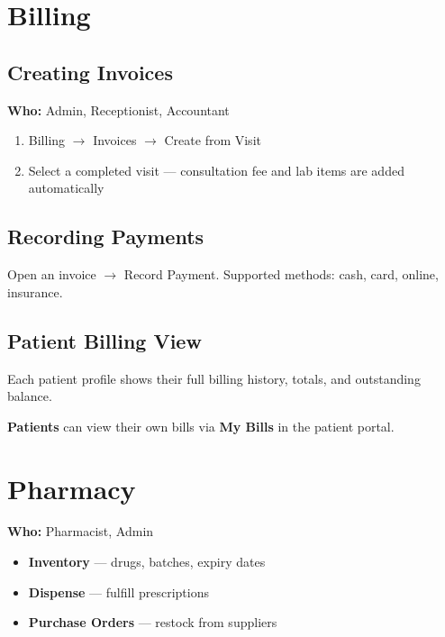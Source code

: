 \documentclass[11pt,a4paper]{report}
\begin{document}
\chapter{Billing}

\section{Creating Invoices}

\textbf{Who:} Admin, Receptionist, Accountant

\begin{enumerate}[noitemsep]
    \item Billing $\rightarrow$ Invoices $\rightarrow$ Create from Visit
    \item Select a completed visit --- consultation fee and lab items are added automatically
\end{enumerate}

\section{Recording Payments}

Open an invoice $\rightarrow$ Record Payment. Supported methods: cash, card, online, insurance.

\section{Patient Billing View}

Each patient profile shows their full billing history, totals, and outstanding balance.

\textbf{Patients} can view their own bills via \textbf{My Bills} in the patient portal.

\chapter{Pharmacy}

\textbf{Who:} Pharmacist, Admin

\begin{itemize}[noitemsep]
    \item \textbf{Inventory} --- drugs, batches, expiry dates
    \item \textbf{Dispense} --- fulfill prescriptions
    \item \textbf{Purchase Orders} --- restock from suppliers
\end{itemize}
\end{document}
